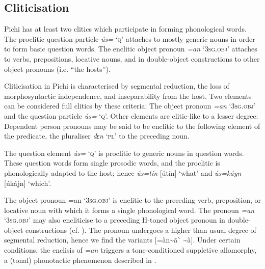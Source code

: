 \subsection{Cliticisation}\label{sec:2.6.3}

Pichi has at least two clitics which participate in forming phonological words. The proclitic question particle \textit{ús=} ‘\textsc{q}’ attaches to mostly generic nouns in order to form basic question words. The enclitic object pronoun \textit{=an} ‘\textsc{3sg.obj}’ attaches to verbs, prepositions, locative nouns, and in double-object constructions to other object pronouns (i.e. “the hosts”). 


Cliticisation in Pichi is characterised by segmental reduction, the loss of morphosyntactic independence, and inseparability from the host. Two elements can be considered full clitics by these criteria: The object pronoun \textit{=an} ‘\textsc{3sg.obj}’ and the question particle \textit{ús=} ‘\textsc{q}’. Other elements are clitic-like to a lesser degree: Dependent person pronouns may be said to be enclitic to the following element of the predicate, the pluraliser \textit{dɛn} ‘\textsc{pl}’ to the preceding noun.



The question element \textit{ús=} ‘\textsc{q}’ is proclitic to generic nouns in question words. These question words form single prosodic words, and the proclitic is phonologically adapted to the host; hence \textit{ús=tín} [útín] ‘what’ and \textit{ús=káyn} [úkájn] ‘which’.



The object pronoun =an ‘\textsc{3sg.obj}’ is enclitic to the preceding verb, preposition, or locative noun\index{} with which it forms a single phonological word. The pronoun \textit{=an} ‘\textsc{3sg.obj}’ may also encliticise to a preceding H-toned object pronoun in double-object constructions (cf. ). The pronoun undergoes a higher than usual degree of segmental reduction, hence we find the variants [=àn{\textasciitilde}ã\`{} {\textasciitilde}à]. Under certain conditions, the enclisis of \textit{=an} triggers a tone-conditioned suppletive allomorphy, a (tonal) phonotactic phenomenon described in .


